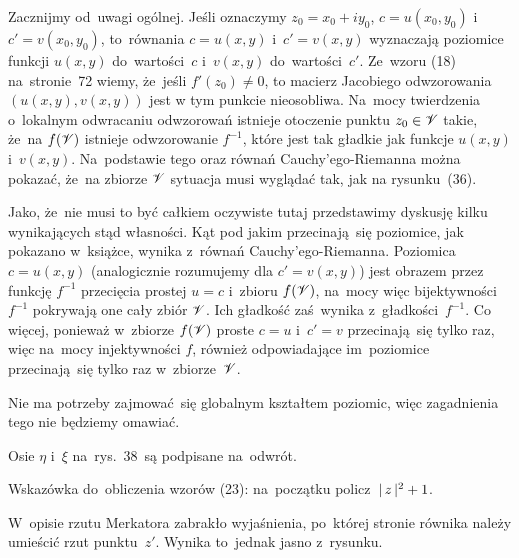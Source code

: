 \documentclass[a4paper,11pt]{article}
\begin{document}
Zacznijmy od~uwagi ogólnej. Jeśli oznaczymy
$z_{ 0 } = x_{ 0 } + i y_{ 0 }$, $c = u( x_{ 0 }, y_{ 0 } )$
i~$c' = v( x_{ 0 }, y_{ 0 } )$, to~równania $c = u( x, y )$
i~$c' = v( x, y )$ wyznaczają poziomice funkcji $u( x, y )$
do~wartości~$c$ i~$v( x, y )$ do~wartości~$c'$. Ze~wzoru (18)
na~stronie~72 wiemy, że~jeśli $f'( z_{ 0 } ) \neq 0$, to macierz
Jacobiego odwzorowania $( u( x, y ), v( x, y ) )$ jest w tym punkcie
nieosobliwa. Na~mocy twierdzenia o~lokalnym odwracaniu odwzorowań
istnieje otoczenie punktu $z_{ 0 } \in \mathcal{V}$ takie, że~na
$f( \mathcal{V} )$ istnieje odwzorowanie $f^{ -1 }$, które jest tak
gładkie jak funkcje $u( x, y )$ i~$v( x, y )$. Na~podstawie tego
oraz równań Cauchy'ego-Riemanna można pokazać, że~na zbiorze $\mathcal{V}$
sytuacja musi wyglądać tak, jak na rysunku~(36).

Jako, że~nie musi to być całkiem oczywiste tutaj przedstawimy
dyskusję kilku wynikających stąd własności. Kąt pod jakim
przecinają~się poziomice, jak pokazano w~książce, wynika z~równań
Cauchy'ego-Riemanna. Poziomica $c = u( x, y )$ (analogicznie
rozumujemy dla $c' = v( x, y )$) jest obrazem przez funkcję
$f^{ -1 }$ przecięcia prostej $u = c$ i~zbioru $f( \mathcal{V} )$, na~mocy
więc bijektywności~$f^{ -1 }$ pokrywają one cały zbiór $\mathcal{V}$. Ich
gładkość zaś~wynika z~gładkości~$f^{ -1 }$. Co więcej, ponieważ
w~zbiorze $f( \mathcal{V} )$ proste $c = u$ i~$c' = v$ przecinają~się
tylko raz, więc na~mocy injektywności $f$, również odpowiadające
im~poziomice przecinają~się tylko raz w~zbiorze~$\mathcal{V}$.

Nie ma potrzeby zajmować~się globalnym kształtem poziomic, więc
zagadnienia tego nie będziemy omawiać.

\vspace{\spaceFour}





\noindent
{} Osie $\eta$ i~$\xi$ na~rys.~38~są podpisane na~odwrót.

\vspace{\spaceFour}





\noindent
{} Wskazówka do~obliczenia wzorów (23): na~początku
policz~$|\, {  z  } \,|^{ 2 } + 1$.

\vspace{\spaceFour}





\noindent
{} W~opisie rzutu Merkatora zabrakło wyjaśnienia, po~której stronie
równika należy umieścić rzut punktu~$z'$. Wynika to~jednak jasno z~rysunku.
\end{document}
